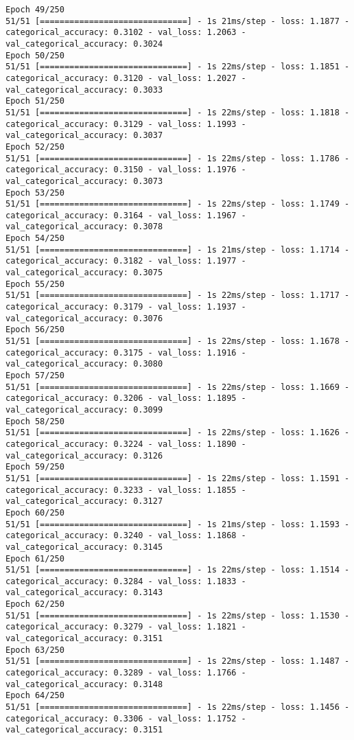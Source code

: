 \begin{lstlisting}
Epoch 49/250
51/51 [==============================] - 1s 21ms/step - loss: 1.1877 - categorical_accuracy: 0.3102 - val_loss: 1.2063 - val_categorical_accuracy: 0.3024
Epoch 50/250
51/51 [==============================] - 1s 22ms/step - loss: 1.1851 - categorical_accuracy: 0.3120 - val_loss: 1.2027 - val_categorical_accuracy: 0.3033
Epoch 51/250
51/51 [==============================] - 1s 22ms/step - loss: 1.1818 - categorical_accuracy: 0.3129 - val_loss: 1.1993 - val_categorical_accuracy: 0.3037
Epoch 52/250
51/51 [==============================] - 1s 22ms/step - loss: 1.1786 - categorical_accuracy: 0.3150 - val_loss: 1.1976 - val_categorical_accuracy: 0.3073
Epoch 53/250
51/51 [==============================] - 1s 22ms/step - loss: 1.1749 - categorical_accuracy: 0.3164 - val_loss: 1.1967 - val_categorical_accuracy: 0.3078
Epoch 54/250
51/51 [==============================] - 1s 21ms/step - loss: 1.1714 - categorical_accuracy: 0.3182 - val_loss: 1.1977 - val_categorical_accuracy: 0.3075
Epoch 55/250
51/51 [==============================] - 1s 22ms/step - loss: 1.1717 - categorical_accuracy: 0.3179 - val_loss: 1.1937 - val_categorical_accuracy: 0.3076
Epoch 56/250
51/51 [==============================] - 1s 22ms/step - loss: 1.1678 - categorical_accuracy: 0.3175 - val_loss: 1.1916 - val_categorical_accuracy: 0.3080
Epoch 57/250
51/51 [==============================] - 1s 22ms/step - loss: 1.1669 - categorical_accuracy: 0.3206 - val_loss: 1.1895 - val_categorical_accuracy: 0.3099
Epoch 58/250
51/51 [==============================] - 1s 22ms/step - loss: 1.1626 - categorical_accuracy: 0.3224 - val_loss: 1.1890 - val_categorical_accuracy: 0.3126
Epoch 59/250
51/51 [==============================] - 1s 22ms/step - loss: 1.1591 - categorical_accuracy: 0.3233 - val_loss: 1.1855 - val_categorical_accuracy: 0.3127
Epoch 60/250
51/51 [==============================] - 1s 21ms/step - loss: 1.1593 - categorical_accuracy: 0.3240 - val_loss: 1.1868 - val_categorical_accuracy: 0.3145
Epoch 61/250
51/51 [==============================] - 1s 22ms/step - loss: 1.1514 - categorical_accuracy: 0.3284 - val_loss: 1.1833 - val_categorical_accuracy: 0.3143
Epoch 62/250
51/51 [==============================] - 1s 22ms/step - loss: 1.1530 - categorical_accuracy: 0.3279 - val_loss: 1.1821 - val_categorical_accuracy: 0.3151
Epoch 63/250
51/51 [==============================] - 1s 22ms/step - loss: 1.1487 - categorical_accuracy: 0.3289 - val_loss: 1.1766 - val_categorical_accuracy: 0.3148
Epoch 64/250
51/51 [==============================] - 1s 22ms/step - loss: 1.1456 - categorical_accuracy: 0.3306 - val_loss: 1.1752 - val_categorical_accuracy: 0.3151

\end{lstlisting}
